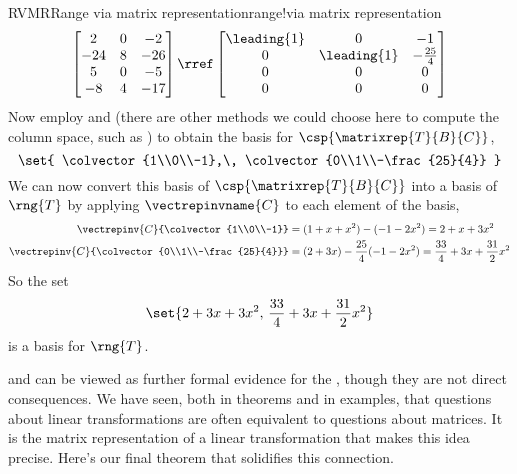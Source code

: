 \begin{example}{RVMR}{Range via matrix representation}{range!via matrix representation}
 \begin{equation*}
 \begin{bmatrix}
 2 & 0 & -2 \\
 -24 & 8 & -26 \\
 5 & 0 & -5 \\
 -8 & 4 & -17
 \end{bmatrix}
 \rref
 \begin{bmatrix}
 \leading{1} & 0 & -1 \\
 0 & \leading{1} & -\frac{25}{4} \\
 0 & 0 & 0 \\
 0 & 0 & 0
 \end{bmatrix}
 \end{equation*}
Now employ  and  (there are other methods we could choose here to compute the column space, such as ) to obtain the basis for $\csp{\matrixrep{T}{B}{C}}$,
%
\begin{equation*}
\set{
\colvector{1\\0\\-1},\,
\colvector{0\\1\\-\frac{25}{4}}
}
\end{equation*}
%
We can  now convert this basis of $\csp{\matrixrep{T}{B}{C}}$ into a basis of $\rng{T}$ by applying $\vectrepinvname{C}$ to each element of the basis,
%
\begin{align*}
\vectrepinv{C}{\colvector{1\\0\\-1}}&=
(1+x+x^2)-(-1-2x^2)=2+x+3x^2\\
%
\vectrepinv{C}{\colvector{0\\1\\-\frac{25}{4}}}&=
(2+3x)-\frac{25}{4}(-1-2x^2)=\frac{33}{4}+3x+\frac{31}{2}x^2
\end{align*}
%
So the set
%
\begin{equation*}
\set{
2+3x+3x^2,\,
\frac{33}{4}+3x+\frac{31}{2}x^2
}
\end{equation*}
%
is a basis for $\rng{T}$.
%
\end{example}
%
 and  can be viewed as further formal evidence for the , though they are not direct consequences.
%
%
We have seen, both in theorems and in examples, that questions about linear transformations are often equivalent to questions about matrices.  It is the matrix representation of a linear transformation that makes this idea precise.  Here's our final theorem that solidifies this connection.
